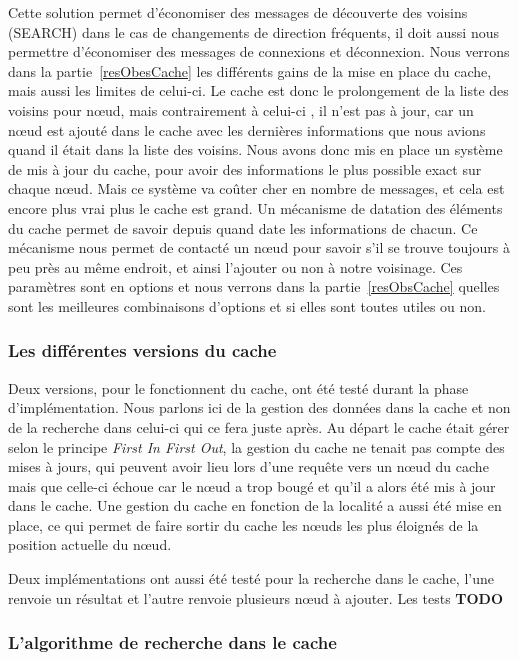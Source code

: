 \par Cette solution permet d'économiser des messages de découverte des voisins (SEARCH) dans le cas de changements de direction fréquents, il doit aussi nous permettre d'économiser des messages de connexions et déconnexion. Nous verrons dans la partie~\ref{resObesCache} les différents gains de la mise en place du cache, mais aussi les limites de celui-ci. Le cache est donc le prolongement de la liste des voisins pour nœud, mais contrairement à celui-ci , il n'est pas à jour, car un nœud est ajouté dans le cache avec les dernières informations que nous avions quand il était dans la liste des voisins. Nous avons donc mis en place un système de mis à jour du cache, pour avoir des informations le plus possible exact sur chaque nœud. Mais ce système va coûter cher en nombre de messages, et cela est encore plus vrai plus le cache est grand. Un mécanisme de datation des éléments du cache permet de savoir depuis quand date les informations de chacun. Ce mécanisme nous permet de contacté un nœud pour savoir s'il se trouve toujours à peu près au même endroit, et ainsi l'ajouter ou non à notre voisinage. Ces paramètres sont en options et nous verrons dans la partie~\ref{resObsCache} quelles sont les meilleures combinaisons d'options et si elles sont toutes utiles ou non.

\subsubsection{Les différentes versions du cache}

Deux versions, pour le fonctionnent du cache, ont été testé durant la phase d'implémentation. Nous parlons ici de la gestion des données dans la cache et non de la recherche dans celui-ci qui ce fera juste après. Au départ le cache était gérer selon le principe \textit{First In First Out}, la gestion du cache ne tenait pas compte des mises à jours, qui peuvent avoir lieu lors d'une requête vers un nœud du cache mais que celle-ci échoue car le nœud a trop bougé et qu'il a alors été mis à jour dans le cache. Une gestion du cache en fonction de la localité a aussi été mise en place, ce qui permet de faire sortir du cache les nœuds les plus éloignés de la position actuelle du nœud.
\par Deux implémentations ont aussi été testé pour la recherche dans le cache, l'une renvoie un résultat et l'autre renvoie plusieurs nœud à ajouter. Les tests \textbf{TODO}


\subsubsection{L'algorithme de recherche dans le cache}

